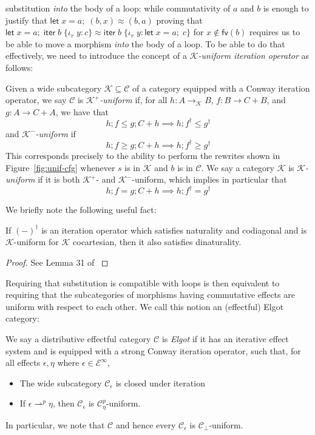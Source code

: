 \documentclass[acmsmall,screen,review]{acmart}
\newcommand{\mc}[1]{\ensuremath{\mathcal{#1}}}
\newcommand{\ms}[1]{\ensuremath{\mathsf{#1}}}
\newcommand{\lto}{:}
\newcommand{\linr}[1]{\iota_r\;{#1}}
\newcommand{\letexpr}[3]{\ensuremath{\ms{let}\;#1 = #2;\;#3}}
\newcommand{\liter}[3]{\ms{iter}\;#1\;\{ \linr{#2} \lto #3 \}}
\newcommand{\rightmove}{\rightharpoonup}
\begin{document}
substitution \emph{into} the body of a loop: while commutativity of $a$ and $b$ is enough to justify
that
$
\letexpr{x}{a}{(b, x)} \approx (b, a)
$
proving that
$
\letexpr{x}{a}{\liter{b}{y}{c}} \approx \liter{b}{y}{\letexpr{x}{a}{c}}
$
for $x \notin \ms{fv}(b)$ requires us to be able to move a morphism \emph{into} the body of a loop.
To be able to do that effectively, we need to introduce the concept of a \emph{\mc{K}-uniform
iteration operator} as follows:
\begin{definition}[Uniformity]
  Given a wide subcategory $\mc{K} \subseteq \mc{C}$ of a category equipped with a Conway iteration
  operator, we say $\mc{C}$ is \emph{$\mc{K}^+$-uniform} if, for all $h : A \to_{\mc{K}} B$, $f : B
  \to C + B$, and $g : A \to C + A$, we have that
  $$
  h ; f \leq g ; C + h \implies h ; f^\dagger \leq g^\dagger 
  $$
  and \emph{$\mc{K}^-$-uniform} if
  $$
  h ; f \geq g ; C + h \implies h ; f^\dagger \geq g^\dagger 
  $$
  This corresponds precisely to the ability to perform the rewrites shown in
  Figure~\ref{fig:unif-cfg} whenever $s$ is in $\mc{K}$ and $b$ is in $\mc{C}$. We say a category
  $\mc{K}$ is \emph{$\mc{K}$-uniform} if it is both $\mc{K}^+$- and $\mc{K}^-$-uniform, which
  implies in particular that
  $$
  h ; f = g ; C + h \implies h ; f^\dagger = g^\dagger 
  $$
\end{definition}
We briefly note the following useful fact:
\begin{proposition}
  If $(-)^\dagger$ is an iteration operator which satisfies naturality and codiagonal and is
  $\mc{K}$-uniform for $\mc{K}$ cocartesian, then it also satisfies dinaturality.
\end{proposition}
\begin{proof}
  See Lemma 31 of \citet{goncharov-18-guarded-traced}
\end{proof}
Requiring that substitution is compatible with loops is then equivalent to requiring that the
subcategories of morphisms having commutative effects are uniform with respect to each other. We
call this notion an (effectful) Elgot category:
\begin{definition}
  We say a distributive effectful category $\mc{C}$ is \emph{Elgot} if it has an iterative effect
  system and is equipped with a strong Conway iteration operator, such that, for all effects
  $\epsilon, \eta$ where $\epsilon \in \mc{E}^\infty$,
  \begin{itemize}
    \item The wide subcategory $\mc{C}_\epsilon$ is closed under iteration  
    \item If $\epsilon \rightmove^p \eta$, then $\mc{C}_\epsilon$ is $\mc{C}_\eta^p$-uniform.
  \end{itemize}
  In particular, we note that $\mc{C}$ and hence every $\mc{C}_\epsilon$ is $\mc{C}_\bot$-uniform.
\end{definition}
\end{document}
